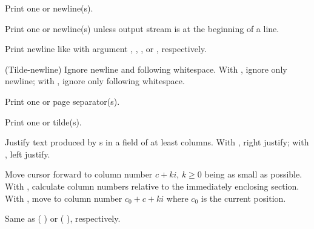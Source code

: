 \begin{LIST}{1cm}
\begin{LIST}{.5cm}
    {
    Print one or  newline(s).
  }

    {
    Print one or  newline(s) unless output stream is at the
    beginning of a line.
  }

    {
    Print newline like  with argument
    , , , or , respectively.
  }

    {
    (Tilde-newline) Ignore newline and following
    whitespace. With \kwd{:}, ignore only newline; with ,
    ignore only following whitespace.
  }

    {
    Print one or  page separator(s).
  }

    {
    Print one or  tilde(s).
  }

    {
    Justify text produced by s in a field of at least
     columns. With \kwd{:}, right justify; with ,
    left justify.
  }

    {
    Move cursor forward to column number $c + ki$, $k \geq 0$ being as small
    as possible. With \kwd{:}, calculate column numbers relative to
    the immediately enclosing section. With , move to column
    number $c_0 + c + ki$ where $c_0$ is the current position.
  }

    {
    Same as (  ) or
    (  ), respectively.
  }


\end{LIST}
\end{LIST}
